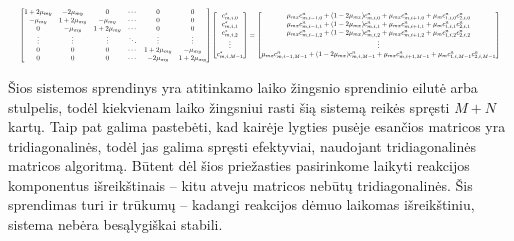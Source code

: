 \begin{align} \label{eqs:adi-system-next}
  \resizebox{\textwidth}{!}{$
  \begin{bmatrix}
    1 + 2\mu_{my} & -2\mu_{my} & 0 & \cdots & 0 & 0\\
    -\mu_{my} & 1 + 2\mu_{my} & -\mu_{my} & \cdots & 0 & 0\\
    0 & -\mu_{my} & 1 + 2\mu_{my} & \cdots & 0 & 0\\
    \vdots & \vdots & \vdots & \ddots & \vdots & \vdots\\
    0 & 0 & 0 & \cdots & 1 + 2\mu_{my} & -\mu_{my}\\
    0 & 0 & 0 & \cdots & -2\mu_{my} & 1 + 2\mu_{my}
  \end{bmatrix}
  \begin{bmatrix}
    c^*_{m,i,0}\\
    c^*_{m,i,1}\\
    c^*_{m,i,2}\\
    \vdots\\
    c^*_{m,i,M-1}
  \end{bmatrix}
  =
  \begin{bmatrix}
    \mu_{mx}c^n_{m,i-1,0}+(1-2\mu_{mx})c^n_{m,i,0}+\mu_{mx}c^n_{m,i+1,0}+\mu_m c^n_{1,i,0}c^n_{2,i,0}\\
    \mu_{mx}c^n_{m,i-1,1}+(1-2\mu_{mx})c^n_{m,i,1}+\mu_{mx}c^n_{m,i+1,1}+\mu_m c^n_{1,i,1}c^n_{2,i,1}\\
    \mu_{mx}c^n_{m,i-1,2}+(1-2\mu_{mx})c^n_{m,i,2}+\mu_{mx}c^n_{m,i+1,2}+\mu_m c^n_{1,i,2}c^n_{2,i,2}\\
    \vdots\\
    \mu_{mx}c^n_{m,i-1,M-1}+(1-2\mu_{mx})c^n_{m,i,M-1}+\mu_{mx}c^n_{m,i+1,M-1}+\mu_m c^n_{1,i,M-1}c^n_{2,i,M-1}
  \end{bmatrix}
  $}
\end{align}

Šios sistemos sprendinys yra atitinkamo laiko žingsnio sprendinio eilutė arba stulpelis, todėl kiekvienam laiko žingsniui rasti šią sistemą reikės spręsti $M + N$ kartų. Taip pat galima pastebėti, kad kairėje lygties pusėje esančios matricos yra tridiagonalinės, todėl jas galima spręsti efektyviai, naudojant tridiagonalinės matricos algoritmą. Būtent dėl šios priežasties pasirinkome laikyti reakcijos komponentus išreikštinais -- kitu atveju matricos nebūtų tridiagonalinės. Šis sprendimas turi ir trūkumų -- kadangi reakcijos dėmuo laikomas išreikštiniu, sistema nebėra besąlygiškai stabili.
